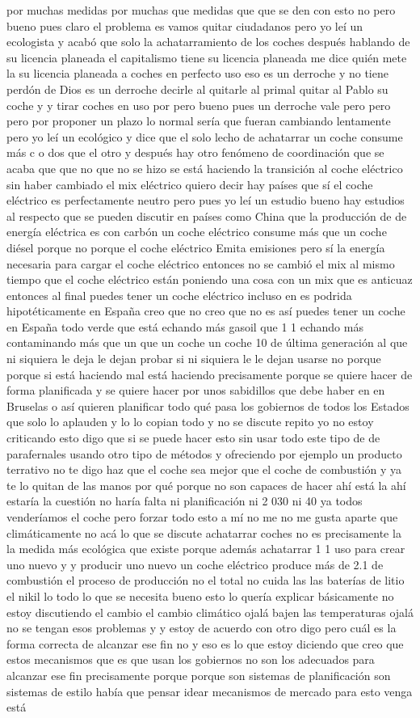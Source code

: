 por muchas medidas por muchas que medidas que que se den con esto no pero bueno pues claro el problema es vamos quitar ciudadanos pero yo leí un ecologista y acabó que solo la achatarramiento de los coches después hablando de su licencia planeada el capitalismo tiene su licencia planeada me dice quién mete la su licencia planeada a coches en perfecto uso eso es un derroche y no tiene perdón de Dios es un derroche decirle al quitarle al primal quitar al Pablo su coche y y tirar coches en uso por pero bueno pues un derroche vale pero pero pero por proponer un plazo lo normal sería que fueran cambiando lentamente pero yo leí un ecológico y dice que el solo lecho de achatarrar un coche consume más c o dos que el otro y después hay otro fenómeno de coordinación que se acaba que que no que no se hizo se está haciendo la transición al coche eléctrico sin haber cambiado el mix eléctrico quiero decir hay países que sí el coche eléctrico es perfectamente neutro pero pues yo leí un estudio bueno hay estudios al respecto que se pueden discutir en países como China que la producción de de energía eléctrica es con carbón un coche eléctrico consume más que un coche diésel porque no porque el coche eléctrico Emita emisiones pero sí la energía necesaria para cargar el coche eléctrico entonces no se cambió el mix al mismo tiempo que el coche eléctrico están poniendo una cosa con un mix que es anticuaz entonces al final puedes tener un coche eléctrico incluso en es podrida hipotéticamente en España creo que no creo que no es así puedes tener un coche en España todo verde que está echando más gasoil que 1 1 echando más contaminando más que un que un coche un coche 10 de última generación al que ni siquiera le deja le dejan probar si ni siquiera le le dejan usarse no porque porque si está haciendo mal está haciendo precisamente porque se quiere hacer de forma planificada y se quiere hacer por unos sabidillos que debe haber en en Bruselas o así quieren planificar todo qué pasa los gobiernos de todos los Estados que solo lo aplauden y lo lo copian todo y no se discute repito yo no estoy criticando esto digo que si se puede hacer esto sin usar todo este tipo de de parafernales usando otro tipo de métodos y ofreciendo por ejemplo un producto terrativo no te digo haz que el coche sea mejor que el coche de combustión y ya te lo quitan de las manos por qué porque no son capaces de hacer ahí está la ahí estaría la cuestión no haría falta ni planificación ni 2 030 ni 40 ya todos venderíamos el coche pero forzar todo esto a mí no me no me gusta aparte que climáticamente no acá lo que se discute achatarrar coches no es precisamente la la medida más ecológica que existe porque además achatarrar 1 1 uso para crear uno nuevo y y producir uno nuevo un coche eléctrico produce más de 2.1 de combustión el proceso de producción no el total no cuida las las baterías de litio el nikil lo todo lo que se necesita bueno esto lo quería explicar básicamente no estoy discutiendo el cambio el cambio climático ojalá bajen las temperaturas ojalá no se tengan esos problemas y y estoy de acuerdo con otro digo pero cuál es la forma correcta de alcanzar ese fin no y eso es lo que estoy diciendo que creo que estos mecanismos que es que usan los gobiernos no son los adecuados para alcanzar ese fin precisamente porque porque son sistemas de planificación son sistemas de estilo había que pensar idear mecanismos de mercado para esto venga está